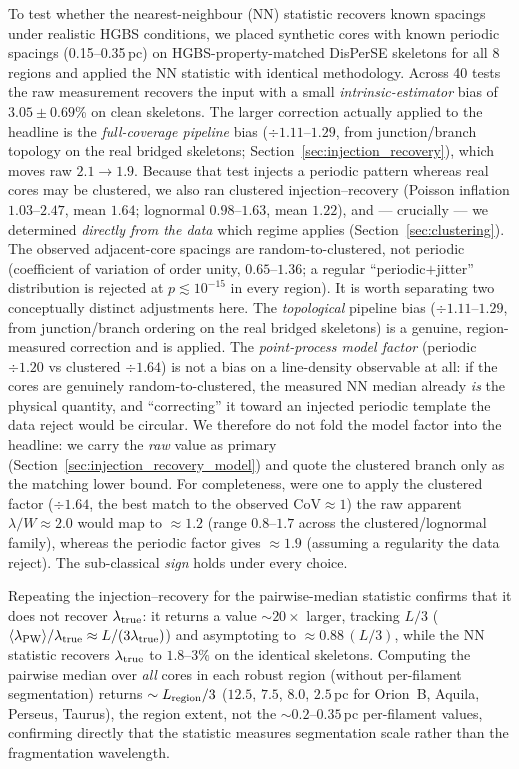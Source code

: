 \documentclass[usenatbib,twoside,twocolumn]{mnras}
\begin{document}
To test whether the nearest-neighbour (NN) statistic recovers known spacings under realistic HGBS conditions, we placed synthetic cores with known periodic spacings (0.15--0.35\,pc) on HGBS-property-matched DisPerSE skeletons for all 8 regions and applied the NN statistic with identical methodology. Across 40 tests the raw measurement recovers the input with a small \emph{intrinsic-estimator} bias of $3.05 \pm 0.69$\% on clean skeletons. The larger correction actually applied to the headline is the \emph{full-coverage pipeline} bias ($\div1.11$--$1.29$, from junction/branch topology on the real bridged skeletons; Section~\ref{sec:injection_recovery}), which moves raw $2.1\to1.9$. Because that test injects a periodic pattern whereas real cores may be clustered, we also ran clustered injection--recovery (Poisson inflation $1.03$--$2.47$, mean $1.64$; lognormal $0.98$--$1.63$, mean $1.22$), and --- crucially --- we determined \emph{directly from the data} which regime applies (Section~\ref{sec:clustering}). The observed adjacent-core spacings are random-to-clustered, not periodic (coefficient of variation of order unity, $0.65$--$1.36$; a regular ``periodic$+$jitter'' distribution is rejected at $p\lesssim10^{-15}$ in every region). It is worth separating two conceptually distinct adjustments here. The \emph{topological} pipeline bias ($\div1.11$--$1.29$, from junction/branch ordering on the real bridged skeletons) is a genuine, region-measured correction and is applied. The \emph{point-process model factor} (periodic $\div1.20$ vs clustered $\div1.64$) is not a bias on a line-density observable at all: if the cores are genuinely random-to-clustered, the measured NN median already \emph{is} the physical quantity, and ``correcting'' it toward an injected periodic template the data reject would be circular. We therefore do not fold the model factor into the headline: we carry the \emph{raw} value as primary (Section~\ref{sec:injection_recovery_model}) and quote the clustered branch only as the matching lower bound. For completeness, were one to apply the clustered factor ($\div1.64$, the best match to the observed CoV$\approx1$) the raw apparent $\lambda/W\approx2.0$ would map to $\approx1.2$ (range $0.8$--$1.7$ across the clustered/lognormal family), whereas the periodic factor gives $\approx1.9$ (assuming a regularity the data reject). The sub-classical \emph{sign} holds under every choice.

Repeating the injection--recovery for the pairwise-median statistic confirms that it does not recover $\lambda_{\rm true}$: it returns a value $\sim$$20\times$ larger, tracking $L/3$ ($\langle\lambda_{\rm PW}\rangle/\lambda_{\rm true}\approx L/(3\lambda_{\rm true})$) and asymptoting to $\approx0.88\,(L/3)$, while the NN statistic recovers $\lambda_{\rm true}$ to $1.8$--$3\%$ on the identical skeletons. Computing the pairwise median over \emph{all} cores in each robust region (without per-filament segmentation) returns $\sim L_{\rm region}/3$ ($12.5$, $7.5$, $8.0$, $2.5$\,pc for Orion~B, Aquila, Perseus, Taurus), the region extent, not the $\sim0.2$--$0.35$\,pc per-filament values, confirming directly that the statistic measures segmentation scale rather than the fragmentation wavelength.
\end{document}
